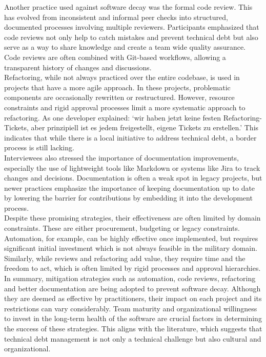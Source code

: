 Another practice used against software decay was the formal code review. This has evolved from inconsistent and informal peer checks into structured, documented processes involving multiple reviewers. Participants emphasized that code reviews not only help to catch mistakes and prevent technical debt but also
serve as a way to share knowledge and create a team wide quality assurance. Code reviews are often combined with Git-based workflows, allowing a transparent history of changes and discussions.\\

Refactoring, while not always practiced over the entire codebase, is used in projects that have a more agile approach. In these projects, problematic components are occasionally rewritten or restructured. However, resource constraints and rigid approval processes limit a more systematic approach to refactoring.
As one developer explained: `wir haben jetzt keine festen Refactoring-Tickets, aber prinzipiell ist es jedem freigestellt, eigene Tickets zu erstellen.' This indicates that while there is a local initiative to address technical debt, a border process is still lacking.\\

Interviewees also stressed the importance of documentation improvements, especially the use of lightweight tools like Markdown or systems like Jira to track changes and decisions. Documentation is often a weak spot in legacy projects, but newer practices 
emphasize the importance of keeping documentation up to date by lowering the barrier for contributions by embedding it into the development process.\\

Despite these promising strategies, their effectiveness are often limited by domain constraints. These are either procurement, budgeting or legacy constraints. Automation, for example, can be highly effective once implemented, but requires significant initial investment which is not always feasible in the military domain.
Similarly, while reviews and refactoring add value, they require time and the freedom to act, which is often limited by rigid processes and approval hierarchies.\\

In summary, mitigation strategies such as automation, code reviews, refactoring and better documentation are being adopted to prevent software decay. Although they are deemed as effective by practitioners, their impact on each project and its restrictions can vary considerably. Team maturity and organizational
willingness to invest in the long-term health of the software are crucial factors in determining the success of these strategies. This aligns with the literature, which suggests that technical debt management is not only a technical challenge but also cultural and organizational.\\

